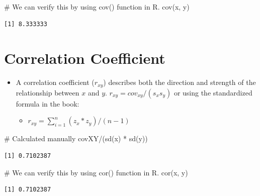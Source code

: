 \documentclass[
  letterpaper,
  DIV=11,
  numbers=noendperiod]{scrreprt}
\newenvironment{Shaded}{\begin{snugshade}}{\end{snugshade}}
\newcommand{\CommentTok}[1]{\textcolor[rgb]{0.37,0.37,0.37}{#1}}
\newcommand{\FunctionTok}[1]{\textcolor[rgb]{0.28,0.35,0.67}{#1}}
\newcommand{\NormalTok}[1]{\textcolor[rgb]{0.00,0.23,0.31}{#1}}
\newcommand{\SpecialCharTok}[1]{\textcolor[rgb]{0.37,0.37,0.37}{#1}}
\providecommand{\tightlist}{%
  \setlength{\itemsep}{0pt}\setlength{\parskip}{0pt}}\usepackage{longtable,booktabs,array}
\begin{document}
\begin{Shaded}
\begin{Highlighting}[]
\CommentTok{\# We can verify this by using cov() function in R.}
\FunctionTok{cov}\NormalTok{(x, y)}
\end{Highlighting}
\end{Shaded}

\begin{verbatim}
[1] 8.333333
\end{verbatim}

\section{Correlation Coefficient}\label{correlation-coefficient}

\begin{itemize}
\tightlist
\item
  A correlation coefficient (\(r_{xy}\)) describes both the direction
  and strength of the relationship between \(x\) and \(y\).
  \(r_{xy} = cov_{xy}/(s_x s_y)\) or using the standardized formula in
  the book:

  \begin{itemize}
  \tightlist
  \item
    \(r_{xy} = \sum^n_{i=1}(z_x*z_y)/(n-1)\)
  \end{itemize}
\end{itemize}

\begin{Shaded}
\begin{Highlighting}[]
\CommentTok{\# Calculated manually}
\NormalTok{covXY}\SpecialCharTok{/}\NormalTok{(}\FunctionTok{sd}\NormalTok{(x) }\SpecialCharTok{*} \FunctionTok{sd}\NormalTok{(y))}
\end{Highlighting}
\end{Shaded}

\begin{verbatim}
[1] 0.7102387
\end{verbatim}

\begin{Shaded}
\begin{Highlighting}[]
\CommentTok{\# We can verify this by using cor() function in R.}
\FunctionTok{cor}\NormalTok{(x, y)}
\end{Highlighting}
\end{Shaded}

\begin{verbatim}
[1] 0.7102387
\end{verbatim}
\end{document}
